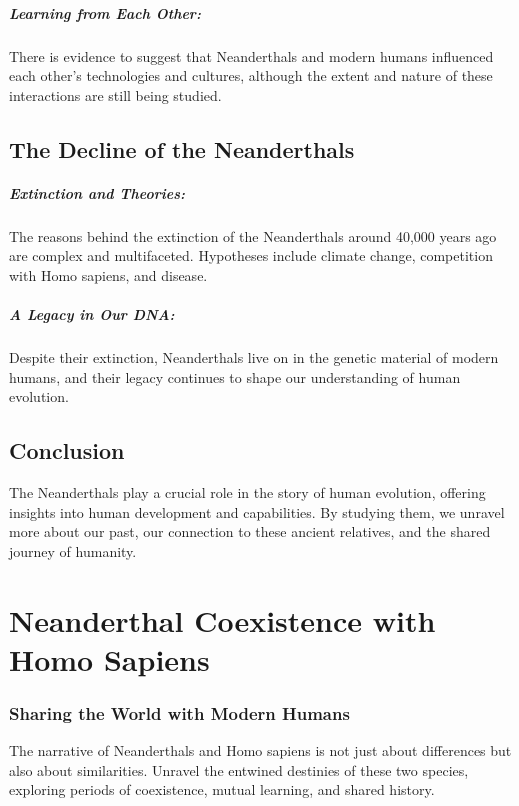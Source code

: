\documentclass[a4paper,12pt]{book}
\begin{document}
\paragraph{Learning from Each Other:}
There is evidence to suggest that Neanderthals and modern humans influenced each other’s technologies and cultures, although the extent and nature of these interactions are still being studied.

\section*{The Decline of the Neanderthals}

\paragraph{Extinction and Theories:}
The reasons behind the extinction of the Neanderthals around 40,000 years ago are complex and multifaceted. Hypotheses include climate change, competition with Homo sapiens, and disease.

\paragraph{A Legacy in Our DNA:}
Despite their extinction, Neanderthals live on in the genetic material of modern humans, and their legacy continues to shape our understanding of human evolution.

\section*{Conclusion}

The Neanderthals play a crucial role in the story of human evolution, offering insights into human development and capabilities. By studying them, we unravel more about our past, our connection to these ancient relatives, and the shared journey of humanity.

\chapter{Neanderthal Coexistence with Homo Sapiens}
\subsection*{Sharing the World with Modern Humans}
The narrative of Neanderthals and Homo sapiens is not just about differences but also about similarities. Unravel the entwined destinies of these two species, exploring periods of coexistence, mutual learning, and shared history.
\end{document}
